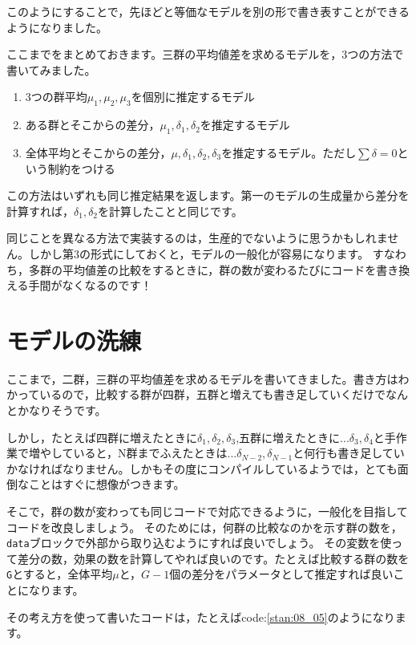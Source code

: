 \documentclass{ltjsbook}
\begin{document}
このようにすることで，先ほどと等価なモデルを別の形で書き表すことができるようになりました。

ここまでをまとめておきます。三群の平均値差を求めるモデルを，3つの方法で書いてみました。
\begin{enumerate}
	\item 3つの群平均$\mu_1,\mu_2,\mu_3$を個別に推定するモデル
	\item ある群とそこからの差分，$\mu_1,\delta_1,\delta_2$を推定するモデル
	\item 全体平均とそこからの差分，$\mu,\delta_1,\delta_2,\delta_3$を推定するモデル。ただし$\sum \delta = 0$という制約をつける
\end{enumerate}
この方法はいずれも同じ推定結果を返します。第一のモデルの生成量から差分を計算すれば，$\delta_1,\delta_2$を計算したことと同じです。

同じことを異なる方法で実装するのは，生産的でないように思うかもしれません。しかし第3の形式にしておくと，モデルの一般化が容易になります。
すなわち，多群の平均値差の比較をするときに，群の数が変わるたびにコードを書き換える手間がなくなるのです！
\section{モデルの洗練}
ここまで，二群，三群の平均値差を求めるモデルを書いてきました。書き方はわかっているので，比較する群が四群，五群と増えても書き足していくだけでなんとかなりそうです。

しかし，たとえば四群に増えたときに$\delta_1,\delta_2,\delta_3$,五群に増えたときに$...\delta_3,\delta_4$と手作業で増やしていると，N群までふえたときは$...\delta_{N-2},\delta_{N-1}$と何行も書き足していかなければなりません。しかもその度にコンパイルしているようでは，とても面倒なことはすぐに想像がつきます。

そこで，群の数が変わっても同じコードで対応できるように，一般化を目指してコードを改良しましょう。
そのためには，何群の比較なのかを示す群の数を，\verb|data|ブロックで外部から取り込むようにすれば良いでしょう。
その変数を使って差分の数，効果の数を計算してやれば良いのです。たとえば比較する群の数を\verb|G|とすると，全体平均$\mu$と，$G-1$個の差分をパラメータとして推定すれば良いことになります。

その考え方を使って書いたコードは，たとえばcode:\ref{stan:08_05}のようになります。
\end{document}

